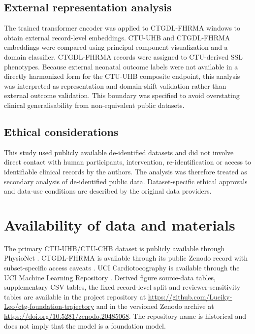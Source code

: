 \documentclass[11pt]{article}
\begin{document}
\subsection{External representation analysis}

The trained transformer encoder was applied to CTGDL-FHRMA windows to obtain external record-level embeddings. CTU-UHB and CTGDL-FHRMA embeddings were compared using principal-component visualization and a domain classifier. CTGDL-FHRMA records were assigned to CTU-derived SSL phenotypes. Because external neonatal outcome labels were not available in a directly harmonized form for the CTU-UHB composite endpoint, this analysis was interpreted as representation and domain-shift validation rather than external outcome validation. This boundary was specified to avoid overstating clinical generalisability from non-equivalent public datasets.

\subsection{Ethical considerations}

This study used publicly available de-identified datasets and did not involve direct contact with human participants, intervention, re-identification or access to identifiable clinical records by the authors. The analysis was therefore treated as secondary analysis of de-identified public data. Dataset-specific ethical approvals and data-use conditions are described by the original data providers.

\section{Availability of data and materials}

The primary CTU-UHB/CTU-CHB dataset is publicly available through PhysioNet \cite{goldberger2000,chudacek2014,ctuuhb}. CTGDL-FHRMA is available through its public Zenodo record with subset-specific access caveats \cite{ctgdl}. UCI Cardiotocography is available through the UCI Machine Learning Repository \cite{uci}. Derived figure source-data tables, supplementary CSV tables, the fixed record-level split and reviewer-sensitivity tables are available in the project repository at \url{https://github.com/Luciky-Leo/ctg-foundation-trajectory} and in the versioned Zenodo archive at \url{https://doi.org/10.5281/zenodo.20485068}. The repository name is historical and does not imply that the model is a foundation model.
\end{document}

